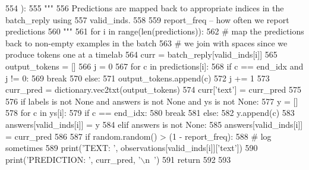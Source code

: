 \begin{DoxyCode}
554     ):
555         \textcolor{stringliteral}{"""}
556 \textcolor{stringliteral}{        Predictions are mapped back to appropriate indices in the batch\_reply using}
557 \textcolor{stringliteral}{        valid\_inds.}
558 \textcolor{stringliteral}{}
559 \textcolor{stringliteral}{        report\_freq -- how often we report predictions}
560 \textcolor{stringliteral}{        """}
561         \textcolor{keywordflow}{for} i \textcolor{keywordflow}{in} range(len(predictions)):
562             \textcolor{comment}{# map the predictions back to non-empty examples in the batch}
563             \textcolor{comment}{# we join with spaces since we produce tokens one at a timelab}
564             curr = batch\_reply[valid\_inds[i]]
565             output\_tokens = []
566             j = 0
567             \textcolor{keywordflow}{for} c \textcolor{keywordflow}{in} predictions[i]:
568                 \textcolor{keywordflow}{if} c == end\_idx \textcolor{keywordflow}{and} j != 0:
569                     \textcolor{keywordflow}{break}
570                 \textcolor{keywordflow}{else}:
571                     output\_tokens.append(c)
572                 j += 1
573             curr\_pred = dictionary.vec2txt(output\_tokens)
574             curr[\textcolor{stringliteral}{'text'}] = curr\_pred
575 
576             \textcolor{keywordflow}{if} labels \textcolor{keywordflow}{is} \textcolor{keywordflow}{not} \textcolor{keywordtype}{None} \textcolor{keywordflow}{and} answers \textcolor{keywordflow}{is} \textcolor{keywordflow}{not} \textcolor{keywordtype}{None} \textcolor{keywordflow}{and} ys \textcolor{keywordflow}{is} \textcolor{keywordflow}{not} \textcolor{keywordtype}{None}:
577                 y = []
578                 \textcolor{keywordflow}{for} c \textcolor{keywordflow}{in} ys[i]:
579                     \textcolor{keywordflow}{if} c == end\_idx:
580                         \textcolor{keywordflow}{break}
581                     \textcolor{keywordflow}{else}:
582                         y.append(c)
583                 answers[valid\_inds[i]] = y
584             \textcolor{keywordflow}{elif} answers \textcolor{keywordflow}{is} \textcolor{keywordflow}{not} \textcolor{keywordtype}{None}:
585                 answers[valid\_inds[i]] = curr\_pred
586 
587             \textcolor{keywordflow}{if} random.random() > (1 - report\_freq):
588                 \textcolor{comment}{# log sometimes}
589                 print(\textcolor{stringliteral}{'TEXT: '}, observations[valid\_inds[i]][\textcolor{stringliteral}{'text'}])
590                 print(\textcolor{stringliteral}{'PREDICTION: '}, curr\_pred, \textcolor{stringliteral}{'\(\backslash\)n~'})
591         \textcolor{keywordflow}{return}
592 
593 
\end{DoxyCode}
